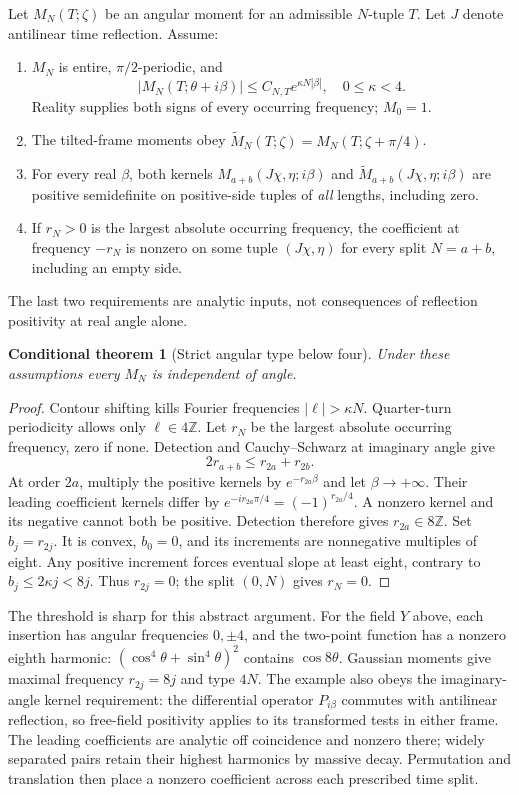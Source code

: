 \documentclass[11pt]{article}
\newtheorem{theorem}[proposition]{Conditional theorem}
\theoremstyle{remark}
\begin{document}
Let $M_N(T;\zeta)$ be an angular moment for an admissible $N$-tuple $T$.
Let $J$ denote antilinear time reflection. Assume:
\begin{enumerate}
\item $M_N$ is entire, $\pi/2$-periodic, and
\[
|M_N(T;\theta+i\beta)|\leq C_{N,T}e^{\kappa N|\beta|},
\quad 0\leq\kappa<4.
\]
Reality supplies both signs of every occurring frequency; $M_0=1$.
\item The tilted-frame moments obey
$\widetilde M_N(T;\zeta)=M_N(T;\zeta+\pi/4)$.
\item For every real $\beta$, both kernels
$M_{a+b}(J\chi,\eta;i\beta)$ and
$\widetilde M_{a+b}(J\chi,\eta;i\beta)$ are positive semidefinite on
positive-side tuples of \emph{all} lengths, including zero.
\item If $r_N>0$ is the largest absolute occurring frequency, the
coefficient at frequency $-r_N$ is nonzero on some tuple $(J\chi,\eta)$
for every split $N=a+b$, including an empty side.
\end{enumerate}
The last two requirements are analytic inputs, not consequences of
reflection positivity at real angle alone.

\begin{theorem}[Strict angular type below four]
Under these assumptions every $M_N$ is independent of angle.
\end{theorem}
\begin{proof}
Contour shifting kills Fourier frequencies $|\ell|>\kappa N$.
Quarter-turn periodicity allows only $\ell\in4\mathbb Z$.
Let $r_N$ be the largest absolute occurring frequency, zero if none.
Detection and Cauchy--Schwarz at imaginary angle give
\[
2r_{a+b}\leq r_{2a}+r_{2b}.
\]
At order $2a$, multiply the positive kernels by $e^{-r_{2a}\beta}$
and let $\beta\to+\infty$. Their leading coefficient kernels differ by
$e^{-ir_{2a}\pi/4}=(-1)^{r_{2a}/4}$. A nonzero kernel and its negative
cannot both be positive. Detection therefore gives $r_{2a}\in8\mathbb Z$.
Set $b_j=r_{2j}$. It is convex, $b_0=0$, and its increments are
nonnegative multiples of eight. Any positive increment forces eventual
slope at least eight, contrary to $b_j\leq2\kappa j<8j$.
Thus $r_{2j}=0$; the split $(0,N)$ gives $r_N=0$.
\end{proof}

The threshold is sharp for this abstract argument.
For the field $Y$ above, each insertion has angular frequencies
$0,\pm4$, and the two-point function has a nonzero eighth harmonic:
$(\cos^4\theta+\sin^4\theta)^2$ contains $\cos8\theta$.
Gaussian moments give maximal frequency $r_{2j}=8j$ and type $4N$.
The example also obeys the imaginary-angle kernel requirement:
the differential operator $P_{i\beta}$ commutes with antilinear
reflection, so free-field positivity applies to its transformed tests
in either frame. The leading coefficients are analytic off coincidence
and nonzero there; widely separated pairs retain their highest
harmonics by massive decay. Permutation and translation then place a
nonzero coefficient across each prescribed time split.
\end{document}
